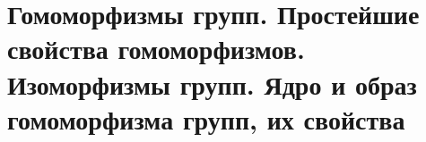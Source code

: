 \section{Гомоморфизмы групп. Простейшие свойства гомоморфизмов. Изоморфизмы групп. Ядро и образ гомоморфизма групп, их свойства}